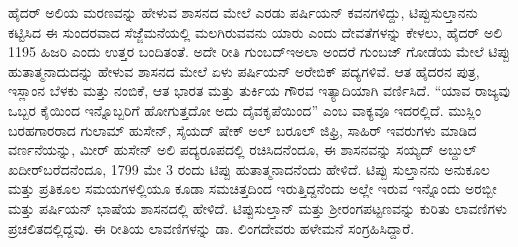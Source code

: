 ಹೈದರ್​ ಅಲಿಯ ಮರಣವನ್ನು ಹೇಳುವ ಶಾಸನದ ಮೇಲೆ ಎರಡು ಪರ್ಷಿಯನ್​ ಕವನಗಳಿದ್ದು, ಟಿಪ್ಪುಸುಲ್ತಾನನು ಕಟ್ಟಿಸಿದ ಈ ಸುಂದರವಾದ ಸೆಜ್ಜೆೆಮನೆಯಲ್ಲಿ ಮಲಗಿರುವವನು ಯಾರು ಎಂದು ದೇವತೆಗಳನ್ನು ಕೇಳಲು, ಹೈದರ್​ ಅಲಿ 1195 ಹಿಜರಿ ಎಂದು ಉತ್ತರ ಬಂದಿತಂತೆ. ಅದೇ ರೀತಿ ಗುಂಬದ್​ಇ​ಅಲಾ ಅಂದರೆ ಗುಂಬಜ್​ ಗೋಡೆಯ ಮೇಲೆ ಟಿಪ್ಪು ಹುತಾತ್ಮನಾದುದನ್ನು ಹೇಳುವ ಶಾಸನದ ಮೇಲೆ ಏಳು ಪರ್ಷಿಯನ್​ ಅರೇಬಿಕ್​ ಪದ್ಯಗಳಿವೆ. ಆತ ಹೈದರನ ಪುತ್ರ, ಇಸ್ಲಾಂನ ಬೆಳಕು ಮತ್ತು ನಂಬಿಕೆ, ಆತ ಭಾರತ ಮತ್ತು ತುರ್ಕಿಯ ಗೌರವ ಇತ್ಯಾದಿಯಾಗಿ ವರ್ಣಿಸಿದೆ. “ಯಾವ ರಾಜ್ಯವು ಒಬ್ಬರ ಕೈಯಿಂದ ಇನ್ನೊಬ್ಬರಿಗೆ ಹೋಗುತ್ತದೋ ಅದು ದೈವಕೃಪೆಯಿಂದ” ಎಂಬ ವಾಕ್ಯವೂ ಇದರಲ್ಲಿದೆ. ಮುಸ್ಲಿಂ ಬರಹಗಾರರಾದ ಗುಲಾಮ್ ಹುಸೇನ್​, ಸೈಯದ್​ ಷೇಕ್​ ಅಲ್​ ಬರೂಲ್​ ಜಿಫ್ರಿ, ಸಾಹಿರ್​ ಇವರುಗಳು ಮಾಡಿದ ವರ್ಣನೆಯನ್ನು, ಮೀರ್​ ಹುಸೇನ್​ ಅಲಿ ಪದ್ಯರೂಪದಲ್ಲಿ ರಚಿಸಿದನೆಂದೂ, ಈ ಶಾಸನವನ್ನು ಸಯ್ಯದ್​ ಅಬ್ದುಲ್​ ಖದೀರ್​ ಬರೆದನೆಂದೂ, 1799 ಮೇ 3 ರಂದು ಟಿಪ್ಪು ಹುತಾತ್ಮನಾದನೆಂದು ಹೇಳಿದೆ. ಟಿಪ್ಪು ಸುಲ್ತಾನನು ಅನುಕೂಲ ಮತ್ತು ಪ್ರತಿಕೂಲ ಸಮಯಗಳಲ್ಲಿಯೂ ಕೂಡಾ ಸಮಚಿತ್ತದಿಂದ ಇರುತ್ತಿದ್ದನೆಂದು ಅಲ್ಲೇ ಇರುವ ಇನ್ನೊಂದು ಅರಬ್ಬೀ ಮತ್ತು ಪರ್ಷಿಯನ್​ ಭಾಷೆಯ ಶಾಸನದಲ್ಲಿ ಹೇಳಿದೆ. ಟಿಪ್ಪುಸುಲ್ತಾನ್​ ಮತ್ತು ಶ‍್ರೀರಂಗಪಟ್ಟಣವನ್ನು ಕುರಿತು ಲಾವಣಿಗಳು ಪ್ರಚಲಿತದಲ್ಲಿದ್ದವು. ಈ ರೀತಿಯ ಲಾವಣಿಗಳನ್ನು ಡಾ. ಲಿಂಗದೇವರು ಹಳೇಮನೆ ಸಂಗ್ರಹಿಸಿದ್ದಾರೆ.

\theendnotes

